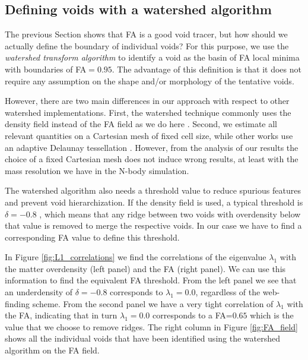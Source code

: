 \documentclass[a4,useAMS,usenatbib,usegraphicx]{mn2e}
\begin{document}
   
\subsection{Defining voids with a watershed algorithm}
\label{subsec:watershed}


The previous Section shows that FA is a good void tracer, but how
should we actually define the boundary of individual voids?
For this purpose, we use the \textit{watershed transform algorithm}
\citep{Beucher79,Beucher93} to identify a void as the basin of FA
local minima with boundaries of FA$=0.95$. 
The advantage of this definition is that it does not require any
assumption on the shape and/or morphology of the tentative voids. 

However, there are two main differences in our approach with respect to other
watershed implementations.
First, the watershed technique commonly uses the density field
instead of the FA field as we do here
\citep{Platen07,Neyrinck08}.   
Second, we estimate all relevant quantities on a Cartesian mesh of
fixed cell size, while other works use an adaptive Delaunay tessellation
\citep{Schaap00}.
However, from the analysis of our results the choice of a fixed
Cartesian mesh does not induce wrong results, at least with
the mass resolution we have in the N-body simulation. 

The watershed algorithm also needs a threshold value to reduce
spurious features and prevent void hierarchization.  
If the density field is used, a typical threshold is
$\delta = -0.8$ \citep{Platen07},  which means that any ridge between
two voids with overdensity below that value is removed to merge the
respective voids. 
In our case we have to find a corresponding FA value
to define this threshold. 

In Figure \ref{fig:L1_correlations} we find the correlations of
the eigenvalue $\lambda_1$ with the matter overdensity (left panel) and
the FA (right panel).
We can use this information to find the equivalent FA threshold. 
From the left panel we see that an underdensity of $\delta=-0.8$ 
corresponds to $\lambda_1=0.0$, regardless of the web-finding
scheme.
From the second panel we have a very tight correlation of $\lambda_1$
with the FA, indicating that in turn $\lambda_1=0.0$ corresponds to a
FA=$0.65$ which is the value that we choose to remove ridges. 
The right column in Figure \ref{fig:FA_field} shows all the individual
voids that have been identified using the watershed algorithm on the
FA field. 
\end{document}
